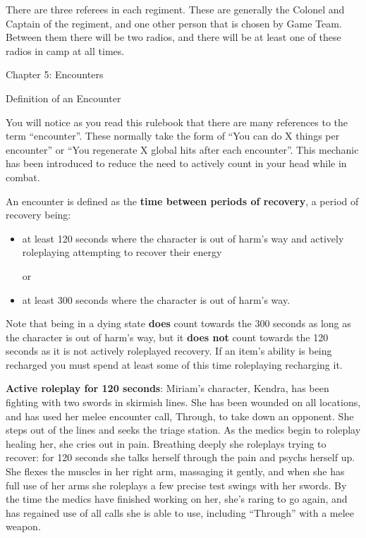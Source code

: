 \documentclass{scrbook}
\begin{document}
There are three referees in each regiment. These are generally the Colonel and Captain of the regiment, and one other person that is chosen by Game Team. Between them there will be two radios, and there will be at least one of these radios in camp at all times.

Chapter 5: Encounters

Definition of an Encounter

You will notice as you read this rulebook that there are many references to the term ``encounter''. These normally take the form of ``You can do X things per encounter'' or ``You regenerate X global hits after each encounter''. This mechanic has been introduced to reduce the need to actively count in your head while in combat.

An encounter is defined as the \textbf{time between periods of recovery}, a period of recovery being:

\begin{itemize}
\item at least 120 seconds where the character is out of harm's way and actively roleplaying attempting to recover their energy

or

\item at least 300 seconds where the character is out of harm's way.

\end{itemize}
Note that being in a dying state \textbf{does} count towards the 300 seconds as long as the character is out of harm's way, but it \textbf{does not} count towards the 120 seconds as it is not actively roleplayed recovery. If an item's ability is being recharged you must spend at least some of this time roleplaying recharging it.

\textbf{Active roleplay for 120 seconds}: Miriam's character, Kendra, has been fighting with two swords in skirmish lines. She has been wounded on all locations, and has used her melee encounter call, Through, to take down an opponent. She steps out of the lines and seeks the triage station. As the medics begin to roleplay healing her, she cries out in pain. Breathing deeply she roleplays trying to recover: for 120 seconds she talks herself through the pain and psychs herself up. She flexes the muscles in her right arm, massaging it gently, and when she has full use of her arms she roleplays a few precise test swings with her swords. By the time the medics have finished working on her, she's raring to go again, and has regained use of all calls she is able to use, including ``Through'' with a melee weapon.
\end{document}
